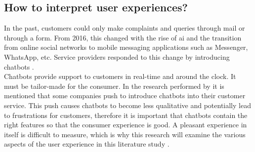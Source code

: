 \subsection{How to interpret user experiences?}
In the past, customers could only make complaints and queries through mail or through a form. From 2016, this changed with the rise of \acrshort{ai} and the transition from online social networks to mobile messaging applications such as Messenger, WhatsApp, etc. Service providers responded to this change by introducing chatbots \citep{Brandtzaeg2018}.\\
\break
Chatbots provide support to customers in real-time and around the clock. It must be tailor-made for the consumer. In the research performed by \citeauthor{Brandtzaeg2018} it is mentioned that some companies push to introduce chatbots into their customer service. This push causes chatbots to become less qualitative and potentially lead to frustrations for customers, therefore it is important that chatbots contain the right features so that the consumer experience is good. A pleasant experience in itself is difficult to measure, which is why this research will examine the various aspects of the user experience in this literature study \citep{Brandtzaeg2018}.

